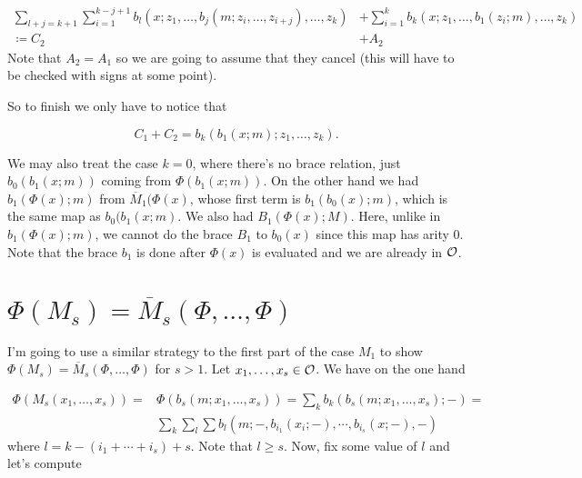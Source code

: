 \documentclass[twoside]{article}
\begin{document}
 \begin{align*}
 \sum_{l+j=k+1}\sum_{i=1}^{k-j+1} b_l(x;z_1,\dots,b_j(m;z_{i},\dots, z_{i+j}),\dots, z_k)&+\sum_{i=1}^{k} b_k(x;z_1,\dots,b_1(z_{i};m),\dots, z_k)\\
 \coloneqq C_2&+A_2
 \end{align*}
 Note that $A_2=A_1$ so we are going to assume that they cancel (this will have to be checked with signs at some point).
 
 So to finish we only have to notice that 
 
 $$C_1+C_2=b_k(b_1(x;m);z_1,\dots, z_k).$$
 
 
 We may also treat the case $k=0$, where there's no brace relation, just $b_0(b_1(x;m))$ coming from $\Phi(b_1(x;m))$. On the other hand we had $b_1(\Phi(x);m)$ from $\overline{M}_1(\Phi(x)$, whose first term is $b_1(b_0(x);m)$, which is the same map as $b_0(b_1(x;m)$. We also had $B_1(\Phi(x);M)$. Here, unlike in $b_1(\Phi(x);m)$, we cannot do the brace $B_1$ to $b_0(x)$ since this map has arity 0. Note that the brace $b_1$ is done after $\Phi(x)$ is evaluated and we are already in ${\mathcal O}$. 



\section{$\Phi(M_s)=\overline{M}_s(\Phi,\dots,\Phi)$}


I'm going to use a similar strategy to the first part of the case $M_1$ to show $\Phi(M_s)=\overline{M}_s(\Phi,\dots,\Phi)$ for $s>1$. Let $x_1,\dots, x_s\in{\mathcal O}$. We have on the one hand

\begin{align*}
\Phi(M_s(x_1,\dots, x_s))=&\Phi(b_s(m;x_1,\dots, x_s))=\sum_k b_k(b_s(m;x_1,\dots, x_s);-)=\\
&\sum_k\sum_l\sum b_l(m; -, b_{i_1}(x_i;-),\cdots,b_{i_s}(x;-),-)
\end{align*}
where $l=k-(i_1+\cdots+i_s)+s$. Note that $l\geq s$. Now, fix some value of $l$ and let's compute
\end{document}
